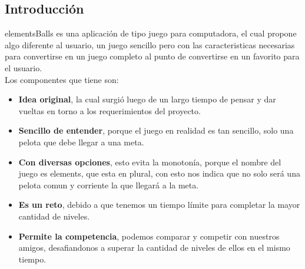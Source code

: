 \documentclass[10pt]{article}
\begin{document}
{\begin{flushleft}
\newpage
\begin{flushleft}
\subsection{Introducci\'on}

\normalsize
elementsBalls es una aplicaci\'on de tipo juego para computadora, el cual propone algo diferente al usuario, un juego sencillo pero con las caracteristicas necesarias para convertirse en un juego completo al punto de convertirse en un favorito para el usuario.\\
Los componentes que tiene son:\\
\begin{itemize}
\item{}\textbf{Idea original}, la cual surgi\'o luego de un largo tiempo de pensar y dar vueltas en torno a los requerimientos del proyecto.
\item{}\textbf{Sencillo de entender}, porque el juego en realidad es tan sencillo, solo una pelota que debe llegar a una meta.
\item{}\textbf{Con diversas opciones}, esto evita la monoton\'ia, porque el nombre del juego es elements, que esta en plural, con esto nos indica que no solo ser\'a una pelota comun y corriente la que llegar\'a a la meta.
\item{}\textbf{Es un reto}, debido a que tenemos un tiempo l\'imite para completar la mayor cantidad de niveles.
\item{}\textbf{Permite la competencia}, podemos comparar y competir con nuestros amigos, desafiandonos a superar la cantidad de niveles de ellos en el mismo tiempo.
\end{itemize}

\end{flushleft}

\newpage

\end{flushleft}}
\end{document}
